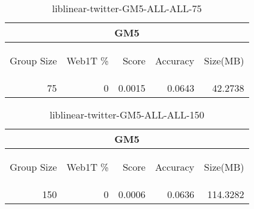 \begin{center}
\begin{table}[htbp] 
 \begin{center}
\begin{tabular}{ | r | r | r | r | r |}
\hline
\multicolumn{5}{|c|}{GM5}\\
\hline
\begin{sideways}Group Size\end{sideways} & \begin{sideways}Web1T \%\end{sideways} & \begin{sideways}Score\end{sideways} & \begin{sideways}Accuracy\end{sideways} & \begin{sideways}Size(MB)\end{sideways}\\
\hline
\multirow{0}{*}{75}
 & 0 & 0.0015 & 0.0643 & 42.2738\\ \cline{2-5}
\hline
\end{tabular}
\caption{liblinear-twitter-GM5-ALL-ALL-75}
\label{table:liblinear-twitter-GM5-ALL-ALL-75}
\end{center}
 \end{table}
\end{center}

\begin{center}
\begin{table}[htbp] 
 \begin{center}
\begin{tabular}{ | r | r | r | r | r |}
\hline
\multicolumn{5}{|c|}{GM5}\\
\hline
\begin{sideways}Group Size\end{sideways} & \begin{sideways}Web1T \%\end{sideways} & \begin{sideways}Score\end{sideways} & \begin{sideways}Accuracy\end{sideways} & \begin{sideways}Size(MB)\end{sideways}\\
\hline
\multirow{0}{*}{150}
 & 0 & 0.0006 & 0.0636 & 114.3282\\ \cline{2-5}
\hline
\end{tabular}
\caption{liblinear-twitter-GM5-ALL-ALL-150}
\label{table:liblinear-twitter-GM5-ALL-ALL-150}
\end{center}
 \end{table}
\end{center}


